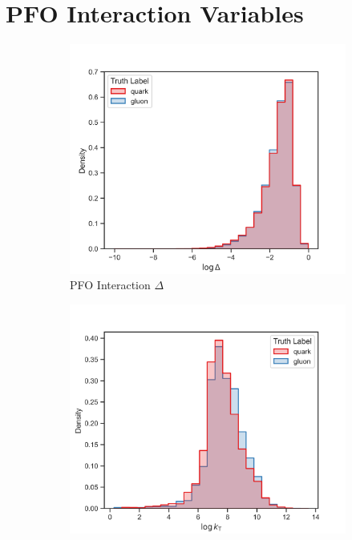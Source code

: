 \FloatBarrier
\newpage

\section{PFO Interaction Variables}
\label{sec:app_pfo_int_variables}

\begin{figure}[!htb]
    \begin{subfigure}[t]{0.49\textwidth}
        \includegraphics[width=\linewidth]{src/plots/distributions/int_PFOs/delta.png}
        \caption{PFO Interaction $\Delta$}
        \label{fig:app_pfo_interaction_delta}
    \end{subfigure}
    \begin{subfigure}[t]{0.49\textwidth}
        \includegraphics[width=\linewidth]{src/plots/distributions/int_PFOs/k_t.png}

\end{subfigure}
\end{figure}
